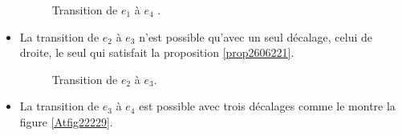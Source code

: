 \begin{Ex}
\begin{itemize}
\begin{figure}[!htb]
\begin{minipage}[c]{.66\linewidth}
  \centering
\begin{logicpuzzle}[rows=2,columns=7,color=cyan!100, width=750px,scale=0.5]
\framepuzzle[black!50]
\end{logicpuzzle}
\end{minipage}
\hfill
\caption{\label{Atfig22227} Transition de $e_{1}$ à $e_{4}$ .}
\end{figure} 
\item La transition de $e_{2}$  à $e_{3}$ n'est possible qu'avec un seul décalage, celui de droite, le seul qui satisfait la proposition \ref{prop2606221}.

\begin{figure}[!htb]
\begin{minipage}[c]{.16\linewidth}
  \centering
\end{minipage}
\hfill
\begin{minipage}[c]{.66\linewidth}
  \centering
\begin{logicpuzzle}[rows=2,columns=7,color=cyan!100, width=750px,scale=0.5]
\framepuzzle[black!50]
\end{logicpuzzle}
\end{minipage}
\caption{\label{Atfig22228} Transition de $e_{2}$ à $e_{3}$.}
\end{figure}
\item La transition de $e_{3}$ à $e_{4}$ est possible avec trois décalages comme le montre la figure \ref{Atfig22229}.
\begin{figure}[!htb]
\begin{minipage}[c]{.16\linewidth}
  \centering
\begin{logicpuzzle}[rows=2,columns=5,color=cyan!100, width=750px,scale=0.5]
\framepuzzle[black!50]
\end{logicpuzzle}
\end{minipage}
\hfill
\begin{minipage}[c]{.16\linewidth}

\end{minipage}
\end{figure}
\end{itemize}
\end{Ex}
